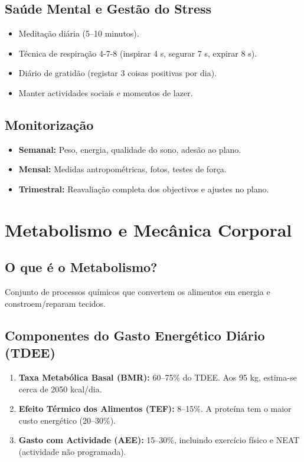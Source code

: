 \documentclass[12pt,a4paper]{scrartcl}
\begin{document}
\subsection{Saúde Mental e Gestão do Stress}
\begin{itemize}
    \item Meditação diária (5–10 minutos).
    \item Técnica de respiração 4-7-8 (inspirar 4 s, segurar 7 s, expirar 8 s).
    \item Diário de gratidão (registar 3 coisas positivas por dia).
    \item Manter actividades sociais e momentos de lazer.
\end{itemize}

\subsection{Monitorização}
\begin{itemize}
    \item \textbf{Semanal:} Peso, energia, qualidade do sono, adesão ao plano.
    \item \textbf{Mensal:} Medidas antropométricas, fotos, testes de força.
    \item \textbf{Trimestral:} Reavaliação completa dos objectivos e ajustes no plano.
\end{itemize}

\section{Metabolismo e Mecânica Corporal}
\subsection{O que é o Metabolismo?}
Conjunto de processos químicos que convertem os alimentos em energia e constroem/reparam tecidos.

\subsection{Componentes do Gasto Energético Diário (TDEE)}
\begin{enumerate}
    \item \textbf{Taxa Metabólica Basal (BMR):} 60–75\% do TDEE. Aos 95 kg, estima-se cerca de 2050 kcal/dia.
    \item \textbf{Efeito Térmico dos Alimentos (TEF):} 8–15\%. A proteína tem o maior custo energético (20–30\%).
    \item \textbf{Gasto com Actividade (AEE):} 15–30\%, incluindo exercício físico e NEAT (actividade não programada).
\end{enumerate}
\end{document}
